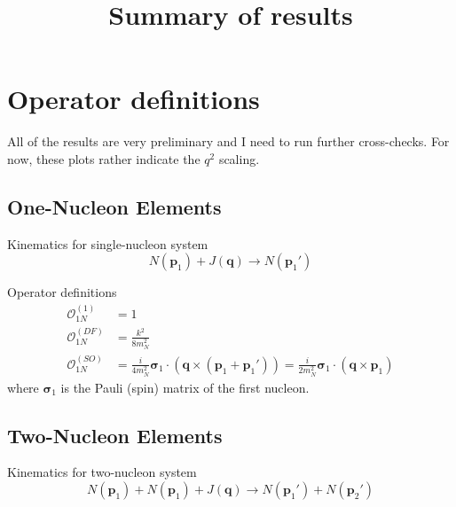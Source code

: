 \documentclass[onecolumn]{revtex4-2}
\renewcommand{\vec}[1]{\boldsymbol{#1}}
\begin{document}
\title{Summary of results}
\maketitle

\section{Operator definitions}

All of the results are very preliminary and I need to run further cross-checks.
For now, these plots rather indicate the $q^2$ scaling.

\subsection{One-Nucleon Elements}
Kinematics for single-nucleon system
\begin{equation}
    N(\vec p_1) + J(\vec q) \to N(\vec p_1')
\end{equation}

Operator definitions
\begin{align}
    \mathcal{O}_{1N}^{(1)}
    &=
    1
    \,\\
    \mathcal{O}_{1N}^{(DF)}
    &=
    \frac{k^2}{8 m_N^2}
    \,\\
    \mathcal{O}_{1N}^{(SO)}
    &=
    \frac{i}{4 m_N^2} \vec \sigma_1 \cdot (\vec q \times (\vec p_1 + \vec p_1'))
    =
    \frac{i}{2 m_N^2} \vec \sigma_1 \cdot (\vec q \times \vec p_1 )
\end{align}
where $\vec \sigma_1$ is the Pauli (spin) matrix of the first nucleon.

\subsection{Two-Nucleon Elements}

Kinematics for two-nucleon system
\begin{equation}
    N(\vec p_1) + N(\vec p_1) + J(\vec q) \to N(\vec p_1') +N(\vec p_2')
\end{equation}
\end{document}
